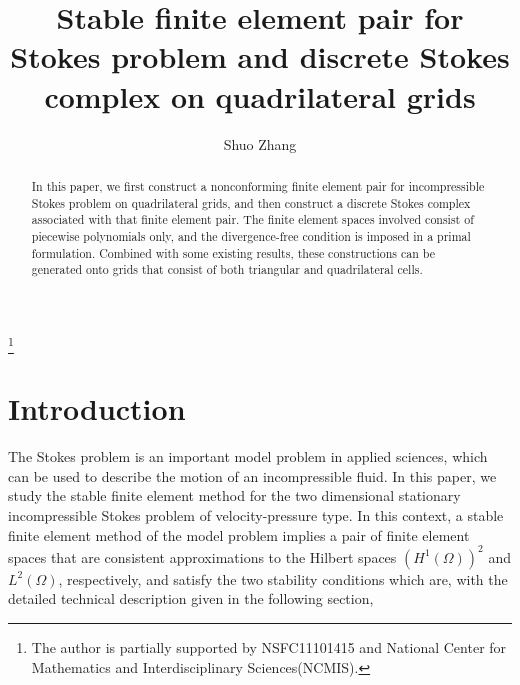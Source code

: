 \documentclass[12pt,showkeys]{amsart}
\begin{document}
\title[Stable Stokes finite element pair on quadrilateral grids]{Stable finite element pair for Stokes problem and discrete Stokes complex on quadrilateral grids}

\author{
      Shuo Zhang 
}

\address{LSEC, Institute of Computational Mathematics, Academy of Mathematics and System Sciences, Chinese Academy of Sciences, Beijing 100190, China.}
\thanks{The author is partially supported by NSFC11101415 and  National Center for Mathematics and Interdisciplinary Sciences(NCMIS).}


\maketitle

\begin{abstract}
{
In this paper, we first construct a nonconforming finite element pair for incompressible Stokes problem on quadrilateral grids, and then construct a discrete Stokes complex associated with that finite element pair. The finite element spaces involved consist of piecewise polynomials only, and the divergence-free condition is imposed in a primal formulation. Combined with some existing results, these constructions can be generated onto grids that consist of both triangular and quadrilateral cells. 
}

 

\end{abstract}

\section{Introduction}

The Stokes problem is an important model problem in applied sciences, which can be used to describe the motion of an incompressible fluid. In this paper, we study the stable finite element method for the two dimensional stationary incompressible Stokes problem of velocity-pressure type. In this context, a stable finite element method of the model problem implies a pair of finite element spaces that are consistent approximations to the Hilbert spaces $(H^1(\Omega))^2$ and $L^2(\Omega)$, respectively, and satisfy the two stability conditions which are, with the detailed technical 
description given in the following section, 
\end{document}

